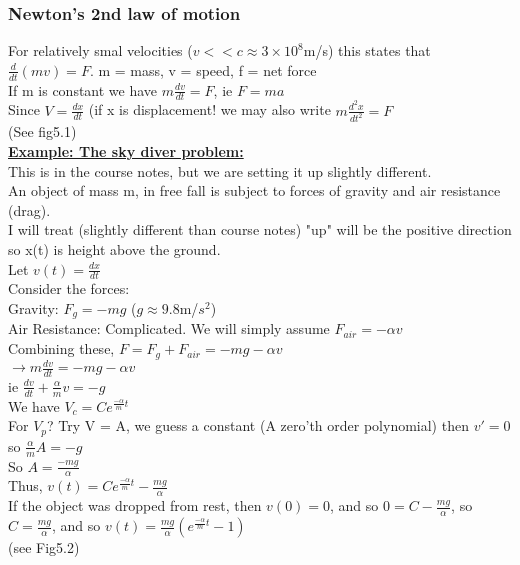 \documentclass[12pt]{article}
\newcommand{\myt}[1]{\textbf{\underline{#1}}}
\begin{document}
	\subsubsection*{Newton's 2nd law of motion}
	For relatively smal velocities ($v << c \approx 3\times 10^8$m/s) this states that $\frac{d}{dt}(mv) = F$. m = mass, v = speed, f = net force\\
	
	If m is constant we have $m\frac{dv}{dt} = F$, ie $F = ma$\\
	
	Since $V = \frac{dx}{dt}$ (if x is displacement! we may also write $m\frac{d^2x}{dt^2} = F$\\
	(See fig5.1)\\
	
	\myt{Example: The sky diver problem:}\\
	This is in the course notes, but we are setting it up slightly different.\\
	An object of mass m, in free fall is subject to forces of gravity and air resistance (drag).\\
	I will treat (slightly different than course notes) "up" will be the positive direction so x(t) is height above the ground.\\
	Let $v(t) = \frac{dx}{dt}$\\
	Consider the forces:\\
	Gravity: $F_g = -mg$ ($g \approx 9.8$m/$s^2$)\\
	Air Resistance: Complicated. We will simply assume $F_{air} = -\alpha v$\\
	
	Combining these, $F = F_g + F_{air} = -mg-\alpha v$\\
	$\rightarrow m\frac{dv}{dt} = -mg-\alpha v$\\
	
	ie $\frac{dv}{dt} + \frac{\alpha}{m}v = -g$\\
	We have $V_c = Ce^{\frac{-\alpha}{m}t}$\\
	For $V_p$? Try V = A, we guess a constant (A zero'th order polynomial) then $v' = 0$\\
	so $\frac{\alpha}{m}A = -g$\\
	So $A = \frac{-mg}{\alpha}$\\
	
	Thus, $v(t) = Ce^{\frac{-\alpha}{m}t} - \frac{mg}{\alpha}$\\
	If the object was dropped from rest, then $v(0) = 0$, and so $0 = C - \frac{mg}{\alpha}$, so $C = \frac{mg}{\alpha}$, and so $v(t) = \frac{mg}{\alpha}(e^{\frac{-\alpha}{m}t} - 1)$\\
	(see Fig5.2)
	
\end{document}
